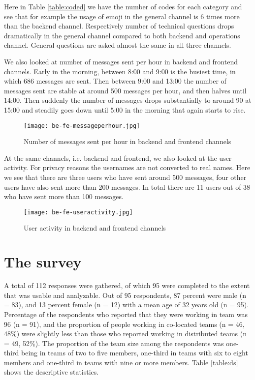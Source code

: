 Here in Table \ref{table:coded} we have the number of codes for each category and see that for example the usage of emoji in the general channel is 6 times more than the backend channel. Respectively number of technical questions drops dramatically in the general channel compared to both backend and operations channel. General questions are asked almost the same in all three channels.

We also looked at number of messages sent per hour in backend and frontend channels. Early in the morning, between 8:00 and 9:00 is the busiest time, in which 686 messages are sent. Then between 9:00 and 13:00 the number of messages sent are stable at around 500 messages per hour, and then halves until 14:00. Then suddenly the number of messages drops substantially to around 90 at 15:00 and steadily goes down until 5:00 in the morning that again starts to rise.

\begin{figure}[hbt!]
\centering
\texttt{[image: be-fe-messageperhour.jpg]}
\caption{Number of messages sent per hour in backend and frontend channels}\label{fig:mph}
\end{figure}

At the same channels, i.e. backend and frontend, we also looked at the user activity. For privacy reasons the usernames are not converted to real names. Here we see that there are three users who have sent around 500 messages, four other users have also sent more than 200 messages. In total there are 11 users out of 38 who have sent more than 100 messages. 

\begin{figure}[hbt!]
\centering
\texttt{[image: be-fe-useractivity.jpg]}
\caption{User activity in backend and frontend channels}\label{fig:useractivity}
\end{figure}



\clearpage
\section{The survey}

A total of 112 responses were gathered, of which 95 were completed to the extent that was usable and analyzable. Out of 95 respondents, 87 percent were male (n = 83), and 13 percent female (n = 12) with a mean age of 32 years old (n = 95). Percentage of the respondents who reported that they were working in team was 96 (n = 91), and the proportion of people working in co-located teams (n = 46, 48\%) were slightly less than those who reported working in distributed teams (n = 49, 52\%). The proportion of the team size among the respondents was one-third being in teams of two to five members, one-third in teams with six to eight members and one-third in teams with nine or more members. Table \ref{table:ds} shows the descriptive statistics. 


